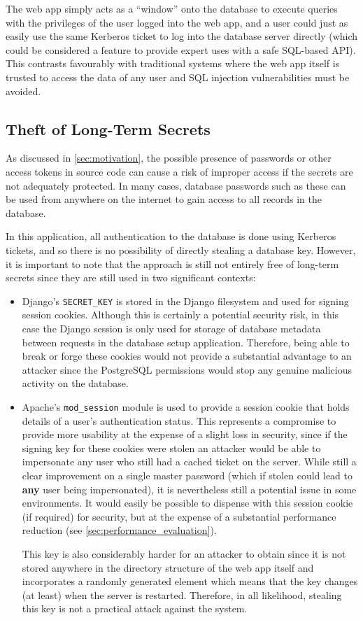 \documentclass[12pt]{report}
\begin{document}
The web app simply acts as a ``window'' onto the database to execute queries with the privileges of the user logged into the web app, and a user could just as easily use the same Kerberos ticket to log into the database server directly (which could be considered a feature to provide expert uses with a safe SQL-based API). This contrasts favourably with traditional systems where the web app itself is trusted to access the data of any user and SQL injection vulnerabilities must be avoided.

\subsection{Theft of Long-Term Secrets}
\label{sec:theft_of_secrets}
As discussed in \autoref{sec:motivation}, the possible presence of passwords or other access tokens in source code can cause a risk of improper access if the secrets are not adequately protected. In many cases, database passwords such as these can be used from anywhere on the internet to gain access to all records in the database.

In this application, all authentication to the database is done using Kerberos tickets, and so there is no possibility of directly stealing a database key. However, it is important to note that the approach is still not entirely free of long-term secrets since they are still used in two significant contexts:
\begin{itemize}
\item
  Django's \verb+SECRET_KEY+ is stored in the Django filesystem and used for signing session cookies. Although this is certainly a potential security risk, in this case the Django session is only used for storage of database metadata between requests in the database setup application. Therefore, being able to break or forge these cookies would not provide a substantial advantage to an attacker since the PostgreSQL permissions would stop any genuine malicious activity on the database.
\item
  Apache's \verb+mod_session+ module is used to provide a session cookie that holds details of a user's authentication status. This represents a compromise to provide more usability at the expense of a slight loss in security, since if the signing key for these cookies were stolen an attacker would be able to impersonate any user who still had a cached ticket on the server. While still a clear improvement on a single master password (which if stolen could lead to \textbf{any} user being impersonated), it is nevertheless still a potential issue in some environments. It would easily be possible to dispense with this session cookie (if required) for security, but at the expense of a substantial performance reduction (see \autoref{sec:performance_evaluation}).

  This key is also considerably harder for an attacker to obtain since it is not stored anywhere in the directory structure of the web app itself and incorporates a randomly generated element which means that the key changes (at least) when the server is restarted. Therefore, in all likelihood, stealing this key is not a practical attack against the system.
\end{itemize}
\end{document}
